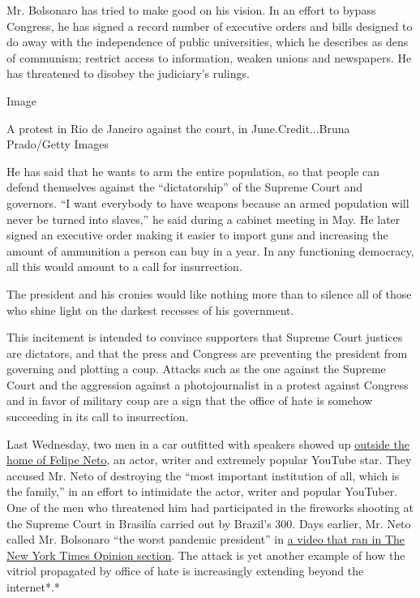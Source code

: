 Mr. Bolsonaro has tried to make good on his vision. In an effort to
bypass Congress, he has signed a record number of executive orders and
bills designed to do away with the independence of public universities,
which he describes as dens of communism; restrict access to information,
weaken unions and newspapers. He has threatened to disobey the
judiciary's rulings.

Image

A protest in Rio de Janeiro against the court, in June.Credit...Bruna
Prado/Getty Images

He has said that he wants to arm the entire population, so that people
can defend themselves against the ``dictatorship'' of the Supreme Court
and governors. ``I want everybody to have weapons because an armed
population will never be turned into slaves,'' he said during a cabinet
meeting in May. He later signed an executive order making it easier to
import guns and increasing the amount of ammunition a person can buy in
a year. In any functioning democracy, all this would amount to a call
for insurrection.

The president and his cronies would like nothing more than to silence
all of those who shine light on the darkest recesses of his government.

This incitement is intended to convince supporters that Supreme Court
justices are dictators, and that the press and Congress are preventing
the president from governing and plotting a coup. Attacks such as the
one against the Supreme Court and the aggression against a
photojournalist in a protest against Congress and in favor of military
coup are a sign that the office of hate is somehow succeeding in its
call to insurrection.

Last Wednesday, two men in a car outfitted with speakers showed up
\href{https://esportes.yahoo.com/noticias/aliados-jair-bolsonaro-atacam-casa-felipe-neto-010129218.html}{outside
the home of Felipe Neto}, an actor, writer and extremely popular YouTube
star. They accused Mr. Neto of destroying the ``most important
institution of all, which is the family,'' in an effort to intimidate
the actor, writer and popular YouTuber. One of the men who threatened
him had participated in the fireworks shooting at the Supreme Court in
Brasilía carried out by Brazil's 300. Days earlier, Mr. Neto called Mr.
Bolsonaro ``the worst pandemic president'' in
\href{https://www.nytimes3xbfgragh.onion/2020/07/15/opinion/coronavirus-covid-brazil-bolsonaro.html}{a
video that ran in The New York Times Opinion section}. The attack is yet
another example of how the vitriol propagated by office of hate is
increasingly extending beyond the internet*.*

